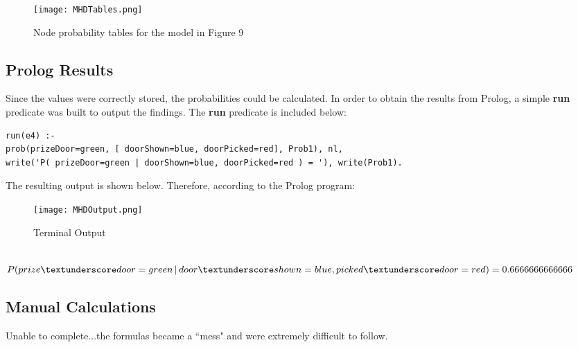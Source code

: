 \documentclass[11pt]{article}
\newcommand{\forceindent}{\leavevmode{\parindent=1em\indent}}
\begin{document}
\begin{figure}[h!]
  \centering
{\texttt{[image: MHDTables.png]}}
    \caption{Node probability tables for the model in Figure 9}
\end{figure}

\subsection{Prolog Results}
\forceindent Since the values were correctly stored, the probabilities could be calculated. In order to obtain the results from Prolog, a simple \textbf{run} predicate was built to output the findings. The \textbf{run} predicate is included below: 


\begin{lstlisting}
run(e4) :-
prob(prizeDoor=green, [ doorShown=blue, doorPicked=red], Prob1), nl,
write('P( prizeDoor=green | doorShown=blue, doorPicked=red ) = '), write(Prob1).
\end{lstlisting}
\vspace{0.5cm}
The resulting output is shown below. Therefore, according to the Prolog program:\\
\begin{figure}[h!]
  \centering
{\texttt{[image: MHDOutput.png]}}
    \caption{Terminal Output}
\end{figure}
\vspace{0.1cm}
\\
$P(prize \textunderscore door=green \,|\, door \textunderscore shown=blue , picked \textunderscore door = red) = 0.6666666666666$\\

\subsection{Manual Calculations}
Unable to complete...the formulas became a ``mess" and were extremely difficult to follow.
\end{document}
